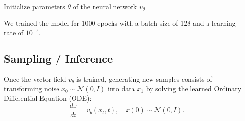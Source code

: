 \documentclass{article}
\begin{document}
\begin{algorithm}[h]
\caption{Training Optimal Transport Flow Matching (OT-CFM)}
\label{algo:ot_cfm_training}
\SetAlgoLined
\DontPrintSemicolon
{}

Initialize parameters $\theta$ of the neural network $v_\theta$\;

\end{algorithm}
We trained the model for 1000 epochs with a batch size of 128 and a learning rate of $10^{-3}$.


\subsection{Sampling / Inference}

Once the vector field $v_\theta$ is trained, generating new samples consists of transforming noise $x_0 \sim \mathcal{N}(0, I)$ into data $x_1$ by solving the learned Ordinary Differential Equation (ODE):
\begin{equation}
    \frac{dx}{dt} = v_\theta(x_t, t), \quad x(0) \sim \mathcal{N}(0, I).
\end{equation}
\end{document}
